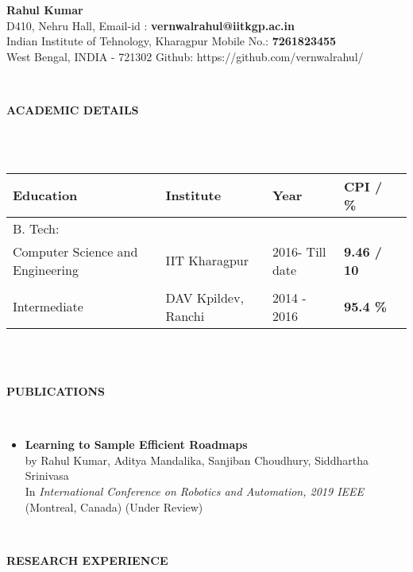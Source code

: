 \documentclass[a4paper,8pt]{article}
\newcommand{\lsep}{-0.5cm}
\newcommand{\resheading}[1]{{\small \colorbox{mygrey}{\begin{minipage}{0.975\textwidth}{\textbf{#1 \vphantom{p\^{E}}}}\end{minipage}}}}
\begin{document}
\begin{center}
\textbf{\Huge Rahul Kumar \\ }  
\indent \hfill \break
\indent D410, Nehru Hall, \hfill Email-id : \textbf{vernwalrahul@iitkgp.ac.in} \\
\indent Indian Institute of Tehnology, Kharagpur \hfill Mobile No.: \textbf{7261823455} \\
\indent West Bengal, INDIA - 721302  \hfill Github: {https://github.com/vernwalrahul/} \\
\end{center}

\hspace{0.5cm}\\[-0.2cm]
\resheading{\textbf{ACADEMIC DETAILS} }\\[\lsep]
\\ 

\indent \begin{tabular}{ l @{\hskip 0.25in} l @{\hskip 0.25in} l @{\hskip 0.25in} l @{\hskip 0.25in} l }
\hline
\textbf{Education} & \textbf{Institute} & \textbf{Year} & \textbf{CPI / \%} \\
\hline
B. Tech:\\
{Computer Science and Engineering} & IIT Kharagpur  & 2016- Till date & \textbf{9.46 / 10} \\ \\
Intermediate & DAV Kpildev, Ranchi & 2014 - 2016 & \textbf{95.4 \%}\\
\hline
\end{tabular}
\\ \hfill \break \\
\resheading{\textbf{ PUBLICATIONS} }\\[\lsep]
\begin{itemize} 
\item \textbf{Learning to Sample Efficient Roadmaps} \\
	by Rahul Kumar, Aditya Mandalika, Sanjiban Choudhury, Siddhartha Srinivasa \\ 
	In \textit{International Conference on Robotics and Automation, 2019 IEEE} (Montreal, Canada) (Under Review)

\end{itemize}

\hspace{0.5cm}\\[-0.2cm]
\resheading{\textbf{RESEARCH EXPERIENCE} }\\[\lsep]
\end{document}
